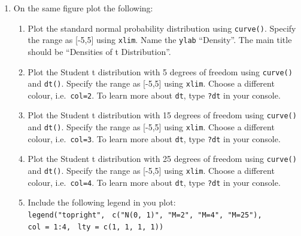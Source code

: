 \documentclass[
]{article}
\providecommand{\tightlist}{%
  \setlength{\itemsep}{0pt}\setlength{\parskip}{0pt}}
\begin{document}
\begin{enumerate}
\def\labelenumi{(\alph{enumi})}
\tightlist
\item
  On the same figure plot the following:

  \begin{enumerate}
  \def\labelenumii{(\roman{enumii})}
  \tightlist
  \item
    Plot the standard normal probability distribution using
    \texttt{curve()}. Specify the range as {[}-5,5{]} using
    \texttt{xlim}. Name the \texttt{ylab} ``Density''. The main title
    should be ``Densities of t Distribution''.
  \item
    Plot the Student t distribution with 5 degrees of freedom using
    \texttt{curve()} and \texttt{dt()}. Specify the range as {[}-5,5{]}
    using \texttt{xlim}. Choose a different colour, i.e.~\texttt{col=2}.
    To learn more about \texttt{dt}, type \texttt{?dt} in your console.
  \item
    Plot the Student t distribution with 15 degrees of freedom using
    \texttt{curve()} and \texttt{dt()}. Specify the range as {[}-5,5{]}
    using \texttt{xlim}. Choose a different colour, i.e.~\texttt{col=3}.
    To learn more about \texttt{dt}, type \texttt{?dt} in your console.
  \item
    Plot the Student t distribution with 25 degrees of freedom using
    \texttt{curve()} and \texttt{dt()}. Specify the range as {[}-5,5{]}
    using \texttt{xlim}. Choose a different colour, i.e.~\texttt{col=4}.
    To learn more about \texttt{dt}, type \texttt{?dt} in your console.
  \item
    Include the following legend in you plot:\\
    \texttt{legend("topright",}~
    \texttt{c("N(0,\ 1)",\ "M=2",\ "M=4",\ "M=25"),}~
    \texttt{col\ =\ 1:4,}~ \texttt{lty\ =\ c(1,\ 1,\ 1,\ 1))}\\
  \end{enumerate}
\end{enumerate}
\end{document}
